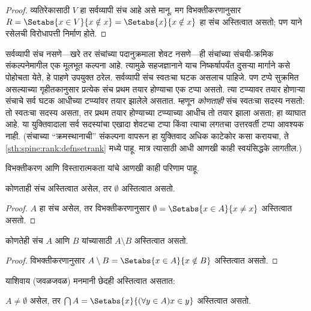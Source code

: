 \begin{proof}
व्यतिरेकासाठी $V$ हा सर्वव्यापी संच आहे असे मानू. मग विभक्तीकरणानुसार $R =
\Setabs{x \in V}{x \notin x} = \Setabs{x}{x \notin x}$ हा संच अस्तित्वात असतो; पण याने रसेलची विरोधापत्ती निर्माण होते.
\end{proof}

सर्वव्यापी संच नसणे---खरे तर संचांच्या पदानुक्रमाला शेवट नसणे---ही संचांच्या संचयी-क्रमिक संकल्पनेमागील एक मूलभूत कल्पना आहे. त्यामुळे सहजज्ञानाने याच निष्कर्षापर्यंत दुसऱ्या मार्गाने कसे पोहोचता येते, हे पाहणे उपयुक्त ठरेल. सर्वव्यापी संच स्वतःचा घटक असलाच पाहिजे. पण टप्पे सुक्रमित असल्याच्या गृहीतकानुसार प्रत्येक संच प्रथम तयार होण्याचा एक टप्पा असतो. त्या टप्प्यावर तयार होणाऱ्या संचाचे सर्व घटक आधीच्या टप्प्यांवर तयार झालेले असतात. म्हणून \emph{कोणताही} संच स्वतःचा सदस्य नसतो: तो स्वतःचा सदस्य असता, तर प्रथम तयार होण्याच्या टप्प्याच्या आधीच तो तयार झाला असता; हा व्याघात आहे. या युक्तिवादाला सर्व सदस्यांचा एखादा शेवटचा टप्पा किंवा त्याचा लगतचा उत्तरवर्ती टप्पा आवश्यक नाही. (संचाच्या ``क्रमस्थानाची'' संकल्पना वापरून हा युक्तिवाद अधिक काटेकोर कसा करायचा, ते \ref{sth:spine:rank:defnsetrank} मध्ये पाहू. मात्र त्यासाठी आधी आणखी काही स्वयंसिद्धके लागतील.)

विभक्तीकरण आणि विस्तारात्मकता यांचे आणखी काही परिणाम पाहू.

\begin{prop}\label{sth:z:sep:prop:emptyexists}
कोणताही संच अस्तित्वात असेल, तर $\emptyset$ अस्तित्वात असतो.
\end{prop}

\begin{proof}
$A$ हा संच असेल, तर विभक्तीकरणानुसार $\emptyset = \Setabs{x \in A}{x \neq x}$ अस्तित्वात असतो.
\end{proof}

\begin{prop}
कोणतेही संच $A$ आणि $B$ यांच्यासाठी $A \setminus B$ अस्तित्वात असतो.
\end{prop}

\begin{proof}
विभक्तीकरणानुसार $A \setminus B = \Setabs{x \in A}{x \notin B}$ अस्तित्वात असतो.
\end{proof}

याशिवाय (जवळजवळ) मनमानी छेदही अस्तित्वात असतात:

\begin{prop}\label{sth:z:sep:prop:intersectionsexist}
$A \neq \emptyset$ असेल, तर $\bigcap A = \Setabs{x}{(\forall y \in A)x \in y}$ अस्तित्वात असतो.
\end{prop}

